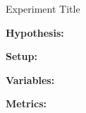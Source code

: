 \begin{experiment}{Experiment Title}

\textbf{Hypothesis:}

\textbf{Setup:}

\textbf{Variables:}

\textbf{Metrics:}




\end{experiment}